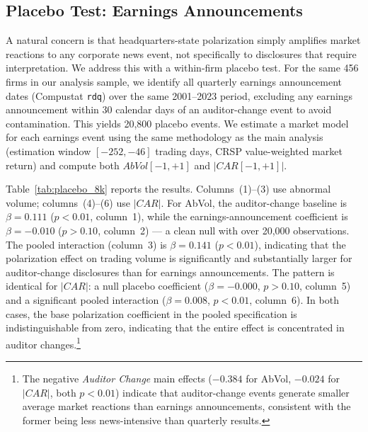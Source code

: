 \documentclass[12pt]{article}
\begin{document}


\subsection{Placebo Test: Earnings Announcements}
\label{sec:placebo}

A natural concern is that headquarters-state polarization simply amplifies
market reactions to any corporate news event, not specifically to disclosures
that require interpretation. We address this with a within-firm placebo test.
For the same 456 firms in our analysis sample, we identify all quarterly
earnings announcement dates (Compustat \texttt{rdq}) over the same 2001--2023
period, excluding any earnings announcement within 30 calendar days of an
auditor-change event to avoid contamination. This yields 20,800 placebo events.
We estimate a market model for each earnings event using the same methodology
as the main analysis (estimation window $[-252, -46]$ trading days, CRSP
value-weighted market return) and compute both $AbVol[-1,+1]$ and
$|CAR[-1,+1]|$.

Table~\ref{tab:placebo_8k} reports the results. Columns~(1)--(3) use
abnormal volume; columns~(4)--(6) use $|CAR|$. For AbVol, the
auditor-change baseline is $\beta = 0.111$ ($p < 0.01$, column~1), while
the earnings-announcement coefficient is $\beta = -0.010$ ($p > 0.10$,
column~2) --- a clean null with over 20,000 observations. The pooled
interaction (column~3) is $\beta = 0.141$ ($p < 0.01$), indicating that
the polarization effect on trading volume is significantly and
substantially larger for auditor-change disclosures than for earnings
announcements. The pattern is identical for $|CAR|$: a null placebo
coefficient ($\beta = -0.000$, $p > 0.10$, column~5) and a significant
pooled interaction ($\beta = 0.008$, $p < 0.01$, column~6). In both
cases, the base polarization coefficient in the pooled specification is
indistinguishable from zero, indicating that the entire effect is
concentrated in auditor changes.\footnote{The negative \textit{Auditor
Change} main effects ($-0.384$ for AbVol, $-0.024$ for $|CAR|$, both
$p < 0.01$) indicate that auditor-change events generate smaller average
market reactions than earnings announcements, consistent with the former
being less news-intensive than quarterly results.}
\end{document}
